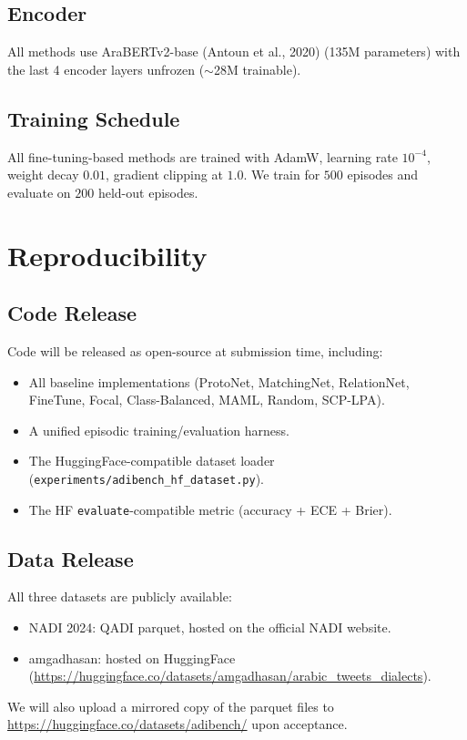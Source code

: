 \documentclass[11pt,a4paper]{article}
\begin{document}
\subsection{Encoder}
All methods use AraBERTv2-base (Antoun et al., 2020) (135M parameters)
with the last 4 encoder layers unfrozen ($\sim$28M trainable).

\subsection{Training Schedule}
All fine-tuning-based methods are trained with AdamW, learning rate
$10^{-4}$, weight decay $0.01$, gradient clipping at $1.0$. We train
for $500$ episodes and evaluate on $200$ held-out episodes.

\section{Reproducibility}

\subsection{Code Release}
Code will be released as open-source at submission time, including:
\begin{itemize}\itemsep0pt
\item All baseline implementations (ProtoNet, MatchingNet, RelationNet,
      FineTune, Focal, Class-Balanced, MAML, Random, SCP-LPA).
\item A unified episodic training/evaluation harness.
\item The HuggingFace-compatible dataset loader
      (\texttt{experiments/adibench\_hf\_dataset.py}).
\item The HF \texttt{evaluate}-compatible metric (accuracy + ECE + Brier).
\end{itemize}

\subsection{Data Release}
All three datasets are publicly available:
\begin{itemize}\itemsep0pt
\item NADI 2024: QADI parquet, hosted on the official NADI website.
\item amgadhasan: hosted on HuggingFace
      (\url{https://huggingface.co/datasets/amgadhasan/arabic_tweets_dialects}).
\end{itemize}
We will also upload a mirrored copy of the parquet files to
\url{https://huggingface.co/datasets/adibench/} upon acceptance.
\end{document}
